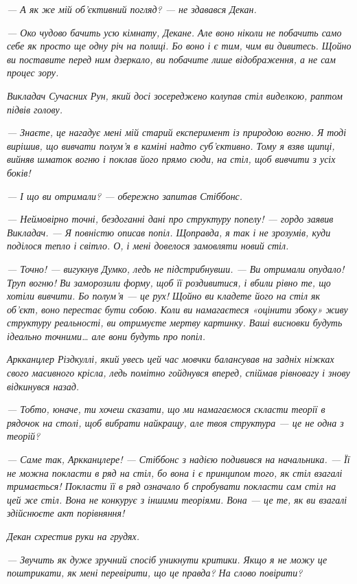 \documentclass[12pt, a4paper, openany]{book}
\begin{document}
\begin{terrybox}
\textit{--- А як же мій об'єктивний погляд? --- не здавався Декан.}

\textit{--- Око чудово бачить усю кімнату, Декане. Але воно ніколи не побачить само себе як просто ще одну річ на полиці. Бо воно і є тим, чим ви дивитесь. Щойно ви поставите перед ним дзеркало, ви побачите лише відображення, а не сам процес зору.}

\textit{Викладач Сучасних Рун, який досі зосереджено колупав стіл виделкою, раптом підвів голову.}

\textit{--- Знаєте, це нагадує мені мій старий експеримент із природою вогню. Я тоді вирішив, що вивчати полум'я в каміні надто суб'єктивно. Тому я взяв щипці, вийняв шматок вогню і поклав його прямо сюди, на стіл, щоб вивчити з усіх боків!}

\textit{--- І що ви отримали? --- обережно запитав Стіббонс.}

\textit{--- Неймовірно точні, бездоганні дані про структуру попелу! --- гордо заявив Викладач. --- Я повністю описав попіл. Щоправда, я так і не зрозумів, куди поділося тепло і світло. О, і мені довелося замовляти новий стіл.}

\textit{--- Точно! --- вигукнув Думко, ледь не підстрибнувши. --- Ви отримали опудало! Труп вогню! Ви заморозили форму, щоб її роздивитися, і вбили рівно те, що хотіли вивчити. Бо полум'я --- це рух! Щойно ви кладете його на стіл як об'єкт, воно перестає бути собою. Коли ви намагаєтеся «оцінити збоку» живу структуру реальності, ви отримуєте мертву картинку. Ваші висновки будуть ідеально точними\ldots{} але вони будуть про попіл.}

\textit{Аркканцлер Різдкуллі, який увесь цей час мовчки балансував на задніх ніжках свого масивного крісла, ледь помітно гойднувся вперед, спіймав рівновагу і знову відкинувся назад.}

\textit{--- Тобто, юначе, ти хочеш сказати, що ми намагаємося скласти теорії в рядочок на столі, щоб вибрати найкращу, але твоя структура --- це не одна з теорій?}

\textit{--- Саме так, Аркканцлере! --- Стіббонс з надією подивився на начальника. --- Її не можна покласти в ряд на стіл, бо вона і є принципом того, як стіл взагалі тримається! Покласти її в ряд означало б спробувати покласти сам стіл на цей же стіл. Вона не конкурує з іншими теоріями. Вона --- це те, як ви взагалі здійснюєте акт порівняння!}

\textit{Декан схрестив руки на грудях.}

\textit{--- Звучить як дуже зручний спосіб уникнути критики. Якщо я не можу це поштрикати, як мені перевірити, що це правда? На слово повірити?}


\end{terrybox}
\end{document}
